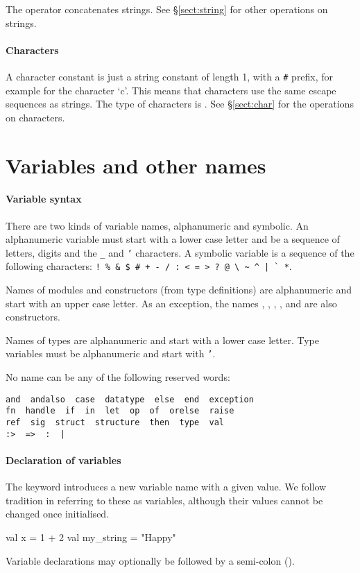 \documentclass[12pt,a4paper]{book}
\begin{document}
The \smlinline{^} operator concatenates strings. See \S\ref{sect:string} for
other operations on strings.

\paragraph{Characters} A character constant is just a string constant of length
1, with a \texttt{\#} prefix, for example  for the character `c'.
This means that characters use the same escape sequences as strings. The type
of characters is . See \S\ref{sect:char} for the operations on characters.

\section{Variables and other names}

\paragraph{Variable syntax} There are two kinds of variable names, alphanumeric and symbolic. An alphanumeric variable must start
with a lower case letter and be a sequence of letters, digits and the \texttt{\_} and \texttt{'} characters. A symbolic variable is a sequence of the following characters: \verb)! % & $ # + - / : < = > ? @ \ ~ ^ | ` *).

Names of modules and constructors (from type definitions) are alphanumeric and
start with an upper case letter. As an exception, the names ,
, , \smlinline{::}, and  are
also constructors.

Names of types are alphanumeric and start
with a lower case letter.
%
Type variables must be alphanumeric and start with \texttt{'}.

No name can be any of the following reserved words:
\begin{verbatim}
and  andalso  case  datatype  else  end  exception
fn  handle  if  in  let  op  of  orelse  raise
ref  sig  struct  structure  then  type  val
:>  =>  :  |
\end{verbatim} 

\paragraph{Declaration of variables} The  keyword introduces a new variable name with a given value.
We follow tradition in referring to these as variables, although their values
cannot be changed once initialised.
\begin{smlcode}
val x = 1 + 2
val my_string = "Happy"
\end{smlcode}
Variable declarations may optionally be followed by a semi-colon (\smlinline{;}).
\end{document}
